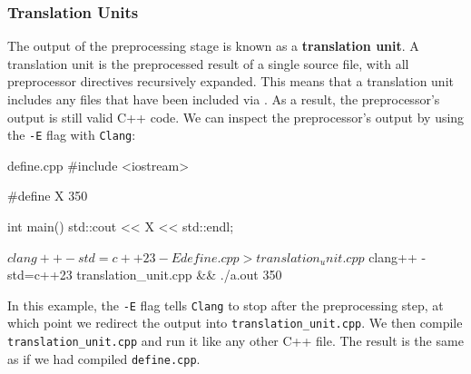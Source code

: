 \documentclass[12pt]{article}
\begin{document}
\subsubsection{Translation Units}
\label{sec:translation-units}

\noindent
The output of the preprocessing stage is known as a \textbf{translation unit}.
A translation unit is the preprocessed result of a single source file, with all preprocessor directives recursively expanded.
This means that a translation unit includes any files that have been included via .
As a result, the preprocessor's output is still valid C++ code.
We can inspect the preprocessor's output by using the \texttt{-E} flag with \texttt{Clang}:

\begin{cxx}{define.cpp}
#include <iostream>

#define X 350

int main() {
	std::cout << X << std::endl;
}
\end{cxx}

\begin{terminal}
$ clang++ -std=c++23 -E define.cpp > translation_unit.cpp
$ clang++ -std=c++23 translation_unit.cpp && ./a.out
350
\end{terminal}

\noindent
In this example, the \texttt{-E} flag tells \texttt{Clang} to stop after the preprocessing step, at which point we redirect the output into \texttt{translation\_unit.cpp}.
We then compile \texttt{translation\_unit.cpp} and run it like any other C++ file.
The result is the same as if we had compiled \texttt{define.cpp}.
\end{document}
